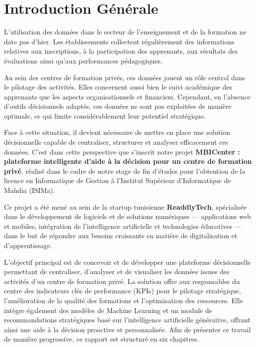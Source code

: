 \chapter*{Introduction Générale}

L'utilisation des données dans le secteur de l'enseignement et de la 
formation ne date pas d'hier. Les établissements collectent régulièrement 
des informations relatives aux inscriptions, à la participation des 
apprenants, aux résultats des évaluations ainsi qu'aux performances 
pédagogiques.

Au sein des centres de formation privés, ces données jouent un rôle 
central dans le pilotage des activités. Elles concernent aussi bien le 
suivi académique des apprenants que les aspects organisationnels et 
financiers. Cependant, en l'absence d'outils décisionnels adaptés, ces 
données ne sont pas exploitées de manière optimale, ce qui limite 
considérablement leur potentiel stratégique.

Face à cette situation, il devient nécessaire de mettre en place une 
solution décisionnelle capable de centraliser, structurer et analyser 
efficacement ces données. C'est dans cette perspective que s'inscrit notre 
projet \textbf{MBICenter : plateforme intelligente d'aide à la décision 
pour un centre de formation privé}, réalisé dans le cadre de notre stage 
de fin d'études pour l'obtention de la licence en Informatique de Gestion 
à l'Institut Supérieur d'Informatique de Mahdia (ISIMa).

Ce projet a été mené au sein de la startup tunisienne 
\textbf{ReaddlyTech}, spécialisée dans le développement de logiciels et 
de solutions numériques — applications web et mobiles, intégration de 
l'intelligence artificielle et technologies éducatives — dans le but de 
répondre aux besoins croissants en matière de digitalisation et 
d'apprentissage.

L'objectif principal est de concevoir et de développer une plateforme 
décisionnelle permettant de centraliser, d'analyser et de visualiser les 
données issues des activités d'un centre de formation privé. La solution 
offre aux responsables du centre des indicateurs clés de performance (KPIs) 
pour le pilotage stratégique, l'amélioration de la qualité des formations 
et l'optimisation des ressources. Elle intègre également des modèles de Machine Learning et un module de 
recommandations stratégiques basé sur l'intelligence artificielle 
générative, offrant ainsi une aide à la décision proactive et personnalisée.
Afin de présenter ce travail de manière progressive, ce rapport est structuré en six chapitres.

